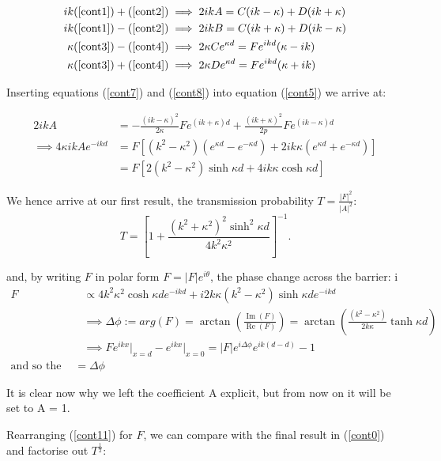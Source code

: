 \documentclass{article}
\begin{document}
\begin{align}
	ik(\ref{cont1})+(\ref{cont2}) &\implies 2ikA = C(ik-\kappa)+D(ik+\kappa) \label{cont5}\\
	ik(\ref{cont1})-(\ref{cont2}) &\implies 2ikB = C(ik+\kappa)+D(ik-\kappa) \label{cont6}\\
	\kappa(\ref{cont3})-(\ref{cont4}) &\implies 2\kappa Ce^{\kappa d} = Fe^{ikd}(\kappa-ik) \label{cont7}\\
	\kappa(\ref{cont3})+(\ref{cont4}) &\implies 2\kappa De^{\kappa d} = Fe^{ikd}(\kappa+ik) \label{cont8}
\end{align}

Inserting equations (\ref{cont7}) and (\ref{cont8}) into equation (\ref{cont5}) we arrive at:

\begin{align}
	2ikA &= -\frac{(ik-\kappa)^2}{2\kappa}Fe^{(ik+\kappa)d}+\frac{(ik+\kappa)^2}{2p}Fe^{(ik-\kappa)d} \label{cont9} \\
	\implies 4\kappa ikAe^{-ikd} &= F[(k^2-\kappa^2)(e^{\kappa d}-e^{-\kappa d})+2ik\kappa(e^{\kappa d}+e^{-\kappa d})] \label{cont10}\\
				     &= F[2(k^2-\kappa^2)\sinh{\kappa d}+4ik\kappa \cosh{\kappa d}] \label{cont11}
\end{align}

We hence arrive at our first result, the transmission probability $T = \frac{|F|^2}{|A|^2}$:
\[
	T = [1+\frac{(k^2+\kappa^2)^2\sinh^2{\kappa d}}{4k^2\kappa^2}]^{-1}
.\] 

and, by writing $F$ in polar form $F = |F|e^{i\theta}$, the phase change across the barrier:
i
\begin{align}
	F &\propto 4k^2\kappa^2 \cosh{\kappa d}e^{-ikd}+i2k\kappa(k^2-\kappa^2)\sinh{\kappa d}e^{-ikd} \\
	  &\implies \Delta \phi := arg(F) = \arctan\left(\frac{\operatorname{Im}(F)}{\operatorname{Re}(F)}\right) = \arctan\left(\frac{(k^2-\kappa^2)}{2k\kappa}\tanh{\kappa d}\right) \\
	  &\implies Fe^{ikx}\rvert_{x=d}-e^{ikx}\rvert_{x=0} = |F|e^{i\Delta \phi}e^{ik(d-d)}-1 \\
	  \text{and so the phase change} = \Delta \phi
\end{align}

It is clear now why we left the coefficient A explicit, but from now on it will be set to A = 1.

Rearranging (\ref{cont11}) for $F$, we can compare with the final result in (\ref{cont0}) and factorise out $T^\frac{1}{2}$:
\end{document}
